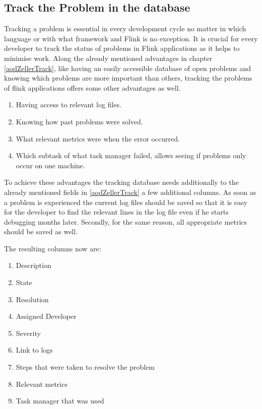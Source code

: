 \subsection{Track the Problem in the database}
Tracking a problem is essential in every development cycle no matter in which language or with what framework and Flink is no exception. It is crucial for every developer to track the status of problems in Flink applications as it helps to minimise work. Along the already mentioned advantages in chapter \ref{aodZellerTrack}, like having an easily accessible database of open problems and knowing which problems are more important than others, tracking the problems of flink applications offers some other advantages as well.

\begin{enumerate}
  \item Having access to relevant log files.
  \item Knowing how past problems were solved.
  \item What relevant metrics were when the error occurred.
  \item Which subtask of what task manager failed, allows seeing if problems only occur on one machine.
\end{enumerate}

To achieve these advantages the tracking database needs additionally to the already mentioned fields in \ref{aodZellerTrack} a few additional columns. As soon as a problem is experienced the current log files should be saved so that it is easy for the developer to find the relevant lines in the log file even if he starts debugging months later. Secondly, for the same reason, all appropriate metrics should be saved as well.

The resulting columns now are:

\begin{enumerate}
  \item Description
  \item State
  \item Resolution
  \item Assigned Developer
  \item Severity
  \item Link to logs
  \item Steps that were taken to resolve the problem
  \item Relevant metrics
  \item Task manager that was used
\end{enumerate}

